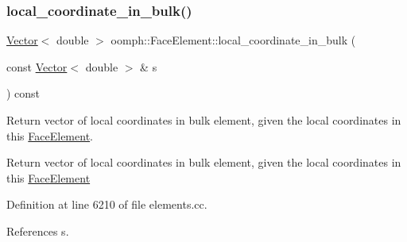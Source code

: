 \mbox{\label{classoomph_1_1FaceElement_a5dd56d5b438c316aca9efa815441b74d}} 
\subsubsection{\texorpdfstring{local\+\_\+coordinate\+\_\+in\+\_\+bulk()}{local\_coordinate\_in\_bulk()}}
{\footnotesize\ttfamily \hyperlink{classoomph_1_1Vector}{Vector}$<$ double $>$ oomph\+::\+Face\+Element\+::local\+\_\+coordinate\+\_\+in\+\_\+bulk (\begin{DoxyParamCaption}\item[{const \hyperlink{classoomph_1_1Vector}{Vector}$<$ double $>$ \&}]{s }\end{DoxyParamCaption}) const}



Return vector of local coordinates in bulk element, given the local coordinates in this \hyperlink{classoomph_1_1FaceElement}{Face\+Element}. 

Return vector of local coordinates in bulk element, given the local coordinates in this \hyperlink{classoomph_1_1FaceElement}{Face\+Element} 

Definition at line 6210 of file elements.\+cc.



References s.



